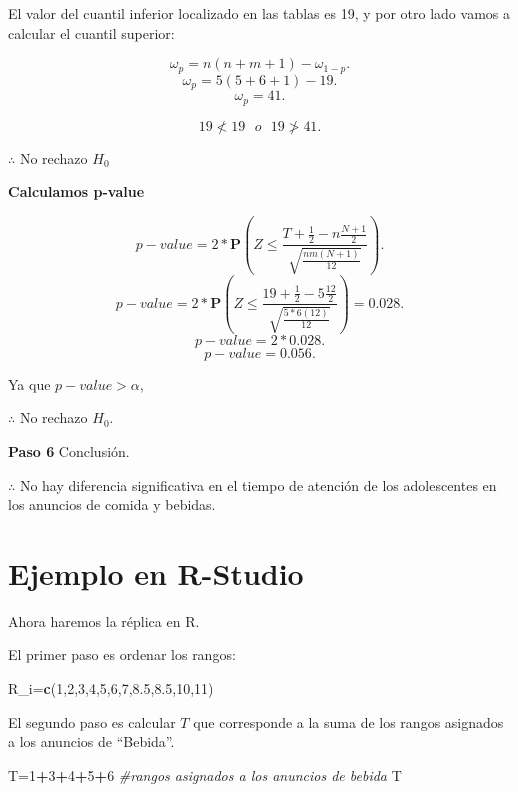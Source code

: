 \documentclass[
  a4paper,
  oneside,
  openany]{book}
\newenvironment{Shaded}{\begin{snugshade}}{\end{snugshade}}
\newcommand{\CommentTok}[1]{\textcolor[rgb]{0.56,0.35,0.01}{\textit{#1}}}
\newcommand{\DecValTok}[1]{\textcolor[rgb]{0.00,0.00,0.81}{#1}}
\newcommand{\FloatTok}[1]{\textcolor[rgb]{0.00,0.00,0.81}{#1}}
\newcommand{\FunctionTok}[1]{\textcolor[rgb]{0.13,0.29,0.53}{\textbf{#1}}}
\newcommand{\NormalTok}[1]{#1}
\newcommand{\OtherTok}[1]{\textcolor[rgb]{0.56,0.35,0.01}{#1}}
\newcommand{\SpecialCharTok}[1]{\textcolor[rgb]{0.81,0.36,0.00}{\textbf{#1}}}
\begin{document}
El valor del cuantil inferior localizado en las tablas es 19, y por otro lado vamos a calcular el cuantil superior:

\[\omega_p= n(n+m+1)-\omega_{1-p}.\]
\[\omega_p= 5(5+6+1)-19.\]
\[\omega_p= 41.\]

\[19 \nless   19  \ \ \  o \ \ \  19 \ngtr 41.\]

\(\therefore\) No rechazo \(H_0\)

\textbf{Calculamos p-value}

\[p-value = 2*\mathbf{P}\left(Z\leq\frac{T+\frac{1}{2}-n\frac{N+1}{2}}{\sqrt{\frac{nm(N+1)}{12}}}\right).\]
\[p-value = 2*\mathbf{P}\left(Z\leq\frac{19+\frac{1}{2}-5\frac{12}{2}}{\sqrt{\frac{5*6(12)}{12}}}\right)=0.028.\]
\[p-value = 2*0.028.\]
\[p-value = 0.056.\]

Ya que \(p-value > \alpha,\)

\(\therefore\) No rechazo \(H_0.\)

\textbf{Paso 6} Conclusión.

\(\therefore\) No hay diferencia significativa en el tiempo de atención de los adolescentes en los anuncios de comida y bebidas.

\hypertarget{ejemplo-en-r-studio-5}{%
\section{Ejemplo en R-Studio}\label{ejemplo-en-r-studio-5}}

Ahora haremos la réplica en R.

El primer paso es ordenar los rangos:

\begin{Shaded}
\begin{Highlighting}[]
\NormalTok{R\_i}\OtherTok{=}\FunctionTok{c}\NormalTok{(}\DecValTok{1}\NormalTok{,}\DecValTok{2}\NormalTok{,}\DecValTok{3}\NormalTok{,}\DecValTok{4}\NormalTok{,}\DecValTok{5}\NormalTok{,}\DecValTok{6}\NormalTok{,}\DecValTok{7}\NormalTok{,}\FloatTok{8.5}\NormalTok{,}\FloatTok{8.5}\NormalTok{,}\DecValTok{10}\NormalTok{,}\DecValTok{11}\NormalTok{)}
\end{Highlighting}
\end{Shaded}

El segundo paso es calcular \(T\) que corresponde a la suma de los rangos asignados a los anuncios de ``Bebida''.

\begin{Shaded}
\begin{Highlighting}[]
\NormalTok{T}\OtherTok{=}\DecValTok{1}\SpecialCharTok{+}\DecValTok{3}\SpecialCharTok{+}\DecValTok{4}\SpecialCharTok{+}\DecValTok{5}\SpecialCharTok{+}\DecValTok{6}  \CommentTok{\#rangos asignados a los anuncios de bebida}
\NormalTok{T}
\end{Highlighting}
\end{Shaded}
\end{document}
